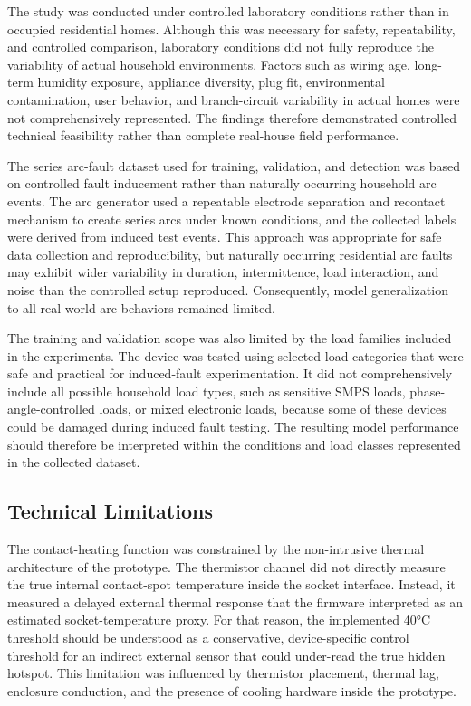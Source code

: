 The study was conducted under controlled laboratory conditions rather
than in occupied residential homes. Although this was necessary for
safety, repeatability, and controlled comparison, laboratory conditions
did not fully reproduce the variability of actual household
environments. Factors such as wiring age, long-term humidity exposure,
appliance diversity, plug fit, environmental contamination, user
behavior, and branch-circuit variability in actual homes were not
comprehensively represented. The findings therefore demonstrated
controlled technical feasibility rather than complete real-house field
performance.

The series arc-fault dataset used for training, validation, and
detection was based on controlled fault inducement rather than naturally
occurring household arc events. The arc generator used a repeatable
electrode separation and recontact mechanism to create series arcs under
known conditions, and the collected labels were derived from induced
test events. This approach was appropriate for safe data collection and
reproducibility, but naturally occurring residential arc faults may
exhibit wider variability in duration, intermittence, load interaction,
and noise than the controlled setup reproduced. Consequently, model
generalization to all real-world arc behaviors remained limited.

The training and validation scope was also limited by the load families
included in the experiments. The device was tested using selected load
categories that were safe and practical for induced-fault
experimentation. It did not comprehensively include all possible
household load types, such as sensitive SMPS loads,
phase-angle-controlled loads, or mixed electronic loads, because some of
these devices could be damaged during induced fault testing. The
resulting model performance should therefore be interpreted within the
conditions and load classes represented in the collected dataset.

\subsection{Technical Limitations}\label{technical-limitations}

The contact-heating function was constrained by the non-intrusive
thermal architecture of the prototype. The thermistor channel did not
directly measure the true internal contact-spot temperature inside the
socket interface. Instead, it measured a delayed external thermal
response that the firmware interpreted as an estimated
socket-temperature proxy. For that reason, the implemented 40°C
threshold should be understood as a conservative, device-specific
control threshold for an indirect external sensor that could under-read
the true hidden hotspot. This limitation was influenced by thermistor
placement, thermal lag, enclosure conduction, and the presence of
cooling hardware inside the prototype.

